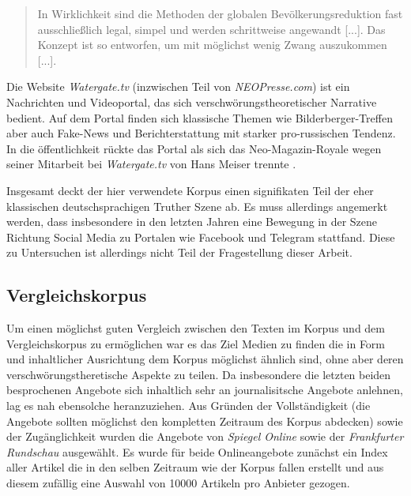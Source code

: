\begin{quotation}
    In Wirklichkeit sind die Methoden der globalen Bevölkerungsreduktion fast ausschließlich legal, simpel und werden schrittweise angewandt [...]. Das Konzept ist so entworfen, um mit möglichst wenig Zwang auszukommen [...]. \parencite{recentr-population}
\end{quotation} 

Die Website \textit{Watergate.tv} (inzwischen Teil von \textit{NEOPresse.com}) ist ein Nachrichten und Videoportal, das sich verschwörungstheoretischer Narrative bedient. 
Auf dem Portal finden sich klassische Themen wie Bilderberger-Treffen \parencite[vgl.][]{watergate-bilderberger} aber auch Fake-News und Berichterstattung mit starker pro-russischen Tendenz.
In die öffentlichkeit rückte das Portal als sich das Neo-Magazin-Royale wegen seiner Mitarbeit bei \textit{Watergate.tv} von Hans Meiser trennte \parencite*[Siehe z.B.][]{spiegel-watergate}.

Insgesamt deckt der hier verwendete Korpus einen signifikaten Teil der eher klassischen deutschsprachigen Truther Szene ab.
Es muss allerdings angemerkt werden, dass insbesondere in den letzten Jahren eine Bewegung in der Szene Richtung Social Media zu Portalen wie Facebook und Telegram stattfand.
Diese zu Untersuchen ist allerdings nicht Teil der Fragestellung dieser Arbeit.

\subsection{Vergleichskorpus}

Um einen möglichst guten Vergleich zwischen den Texten im Korpus und dem Vergleichskorpus zu ermöglichen war es das Ziel Medien zu finden die in Form und inhaltlicher Ausrichtung dem Korpus möglichst ähnlich sind, ohne aber deren verschwörungstheretische Aspekte zu teilen.
Da insbesondere die letzten beiden besprochenen Angebote sich inhaltlich sehr an journalisitsche Angebote anlehnen, lag es nah ebensolche heranzuziehen.
Aus Gründen der Vollständigkeit (die Angebote sollten möglichst den kompletten Zeitraum des Korpus abdecken) sowie der Zugänglichkeit wurden die Angebote von \textit{Spiegel Online} sowie der \textit{Frankfurter Rundschau} ausgewählt.
Es wurde für beide Onlineangebote zunächst ein Index aller Artikel die in den selben Zeitraum wie der Korpus fallen erstellt und aus diesem zufällig eine Auswahl von 10000 Artikeln pro Anbieter gezogen.

